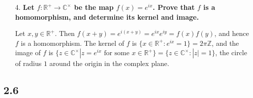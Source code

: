 \documentclass[a4paper,12pt]{article}
\begin{document}
\begin{enumerate}
    \item[4.]
        \boldmath
        \textbf{Let $f \colon \mathbb{R}^+ \to \mathbb{C}^\times$ be the map $f(x) = e^{ix}$. Prove that $f$ is a homomorphism, and determine its kernel and image.} \par
        \unboldmath
        Let $x, y \in \mathbb{R}^+$. Then $f(x + y) = e^{i(x + y)} = e^{ix} e^{iy} = f(x) f(y)$, and hence $f$ is a homomorphism. The kernel of $f$ is $\{ x \in \mathbb{R}^+ : e^{ix} = 1 \} = 2\pi \mathbb{Z}$, and the image of $f$ is $\{ z \in \mathbb{C}^\times | z = e^{ix} \text{ for some } x \in \mathbb{R}^+ \} = \{ z \in \mathbb{C}^\times : |z| = 1 \}$, the circle of radius $1$ around the origin in the complex plane.
\end{enumerate}

\subsection*{2.6}
\end{document}
